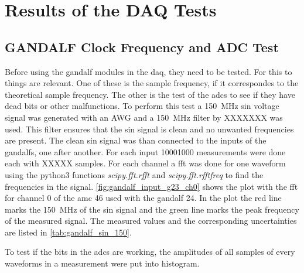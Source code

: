 \chapter{Results of the DAQ Tests}


\section{GANDALF Clock Frequency and ADC Test}
Before using the \ac{gandalf} modules in the \ac{daq}, they need to be tested.
For this to things are relevant.
One of these is the sample frequency, if it correspondes to the theoretical sample frequency.
The other is the test of the \acp{adc} to see if they have dead bits or other malfunctions.
To perform this test a \SI{150}{\mega\hertz} sin voltage signal was generated with an AWG and a \SI{150}{\mega\hertz} filter by XXXXXXX was used.
This filter ensures that the sin signal is clean and no unwanted frequencies are present.
The clean sin signal was than connected to the inputs of the \acp{gandalf}, one after another.
For each input \num{1000}1000 measurements were done each with XXXXX samples.
For each channel a \ac{fft} was done for one waveform using the python3 functions \textit{scipy.fft.rfft} and \textit{scipy.fft.rfftfreq} to find the frequencies in the signal.
\autoref{fig:gandalf_input_g23_ch0} shows the plot with the \ac{fft} for channel 0 of the \ac{amc} 46 used with the \ac{gandalf} 24.
In the plot the red line marks the \SI{150}{\mega\hertz} of the sin signal and the green line marks the peak frequency of the measured signal.
The measured values and the corresponding uncertainties are listed in \autoref{tab:gandalf_sin_150}.




To test if the bits in the \acp{adc} are working, the amplitudes of all samples of every waveforms in a measurement were put into histogram.





